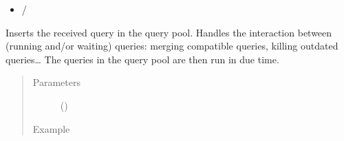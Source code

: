 \documentclass[letterpaper,10pt,english]{sphinxmanual}
\begin{document}
\begin{fulllineitems}
\begin{fulllineitems}
\begin{description}
\begin{itemize}
\item {} 
{\hyperref[\detokenize{index:Generator.Generator.process_query}]{}} / {\hyperref[\detokenize{index:Generator.GenerationHandler.process_query}]{}}

\end{itemize}

\end{description}

Inserts the received query in the query pool. 
Handles the interaction between (running and/or waiting) queries: merging compatible queries, killing outdated queries…
The queries in the query pool are then run in due time.
\begin{quote}\begin{description}
\item[{Parameters}] \leavevmode
{} ({\hyperref[\detokenize{index:Query.Query}]{}}) \textendash{} 

\item[{Example}] \leavevmode
\end{description}\end{quote}


\end{fulllineitems}
\end{fulllineitems}
\end{document}
